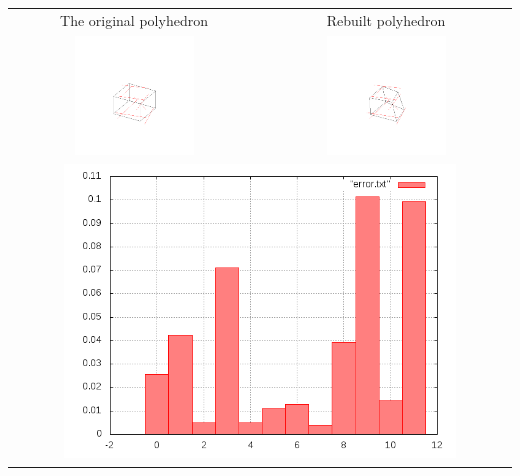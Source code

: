 \documentclass[11pt,fleqn,a4paper]{scrartcl}
\begin{document}
\begin{center}

\begin{tabular}{|c|c|}
\hline
The original polyhedron& Rebuilt polyhedron \\
\includegraphics[width=0.5\textwidth]{variant2/images/24/input.png} &
\includegraphics[width=0.5\textwidth]{variant2/images/24/out.png} \\
\midrule
\multicolumn{2}{|c|}{ \includegraphics[width=0.8\textwidth]{variant2/images/24/error.png}} \\
\hline
\end{tabular}
\end{center}
\end{document}
